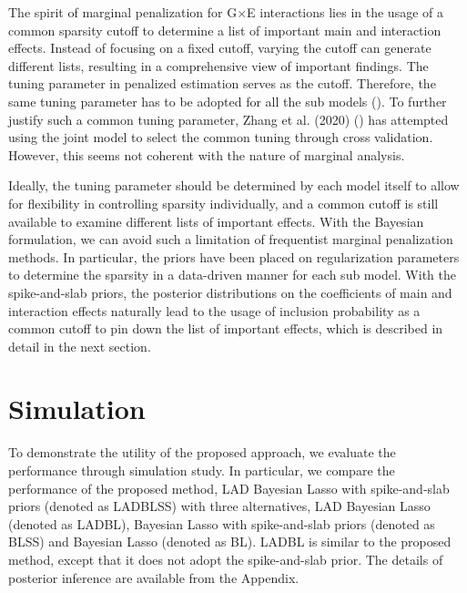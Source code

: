 \documentclass[12pt]{article}
\begin{document}
The spirit of marginal penalization for G$\times$E interactions lies in the usage of a common sparsity cutoff to determine a list of important main and interaction effects. Instead of focusing on a fixed cutoff, varying the cutoff can generate different lists, resulting in a comprehensive view of important findings. The tuning parameter in penalized estimation serves as the cutoff. Therefore, the same tuning parameter has to be adopted for all the sub models (\cite{SLH,CZJ,ZSX}). To further justify such a common tuning parameter, Zhang et al. (2020) (\cite{ZSX}) has attempted using the joint model to select the common tuning through cross validation. However, this seems not coherent with the nature of marginal analysis. 

Ideally, the tuning parameter should be determined by each model itself to allow for flexibility in controlling sparsity individually, and a common cutoff is still available to examine different lists of important effects. With the Bayesian formulation, we can avoid such a limitation of frequentist marginal penalization methods. In particular, the priors have been placed on regularization parameters to determine the sparsity in a data-driven manner for each sub model. With the spike-and-slab priors, the posterior distributions on the coefficients of main and interaction effects naturally lead to the usage of inclusion probability as a common cutoff to pin down the list of important effects, which is described in detail in the next section.   



\section{Simulation}

To demonstrate the utility of the proposed approach, we evaluate the performance through simulation study. In particular, we compare the performance of the proposed method, LAD Bayesian Lasso with spike-and-slab priors (denoted as LADBLSS) with three alternatives, LAD Bayesian Lasso (denoted as LADBL), Bayesian Lasso with spike-and-slab priors (denoted as BLSS) and Bayesian Lasso (denoted as BL). LADBL is similar to the proposed method, except that it does not adopt the spike-and-slab prior. The details of posterior inference are available from the Appendix.
\end{document}
